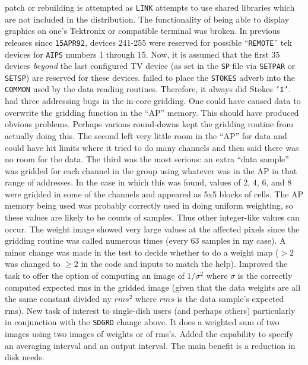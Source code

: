 \begin{description}
   patch or rebuilding is attempted as {\tt LINK} attempts to use
   shared libraries which are not included in the distribution.
 The functionality of being able to display
   graphics on one's Tektronix or compatible terminal was broken.  In
   previous releases since {\tt 15APR92}, devices 241-255 were
   reserved for possible ``{\tt REMOTE}'' tek devices for {\tt AIPS}
   numbers 1 through 15.  Now, it is assumed that the first 35 devices
   {\it beyond} the last configured TV device (as set in the {\tt SP}
   file via {\tt SETPAR} or {\tt SETSP}) are reserved for these
   devices.
 failed to place the {\tt STOKES} adverb into the {\tt
   COMMON} used by the data reading routines.  Therefore, it always
   did Stokes \hbox{{\tt 'I'}}.
 had three addressing bugs in the in-core gridding.  One
   could have caused data to overwrite the gridding function in the
   ``AP'' memory.  This should have produced obvious problems.  Perhaps
   various round-downs kept the gridding routine from actually doing
   this.  The second left very little room in the ``AP'' for data and
   could have hit limits where it tried to do many channels and then
   said there was no room for the data.  The third was the most
   serious: an extra ``data sample'' was gridded for each channel in
   the group using whatever was in the AP in that range of addresses.
   In the case in which this was found, values of 2, 4, 6, and 8 were
   gridded in some of the channels and appeared as 5x5 blocks of
   cells.  The AP memory being used was probably correctly used in
   doing uniform weighting, so these values are likely to be counts of
   samples.  Thus other integer-like values can occur.  The weight
   image showed very large values at the affected pixels since the
   gridding routine was called numerous times (every 63 samples in my
   case).  A minor change was made in the test to decide whether to do
   a weight map ($> 2$ was changed to $\ge 2$ in the code and inputs
   to match the help).
 Improved the task to offer the option of computing an
   image of $1/\sigma^2$ where $\sigma$ is the correctly computed
   expected rms in the gridded image (given that the data weights are
   all the same constant divided ny $rms^2$ where $rms$ is the data
   sample's expected rms).
 New task of interest to single-dish users (and perhaps
   others) particularly in conjunction with the {\tt SDGRD} change
   above.  It does a weighted sum of two images using two images of
   weights or of rms's.
 Added the capability to specify an averaging interval
   and an output interval.  The main benefit is a reduction in disk
   needs.
\end{description}
